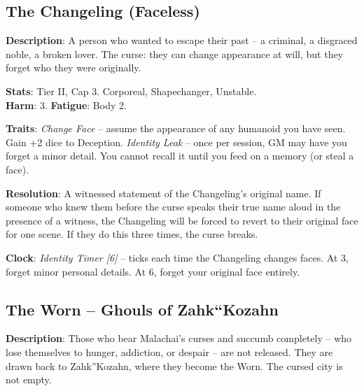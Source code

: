 
\subsection*{The Changeling (Faceless)}

\noindent\textbf{Description}: A person who wanted to escape their past -- a criminal, a disgraced noble, a broken lover. The curse: they can change appearance at will, but they forget who they were originally.

\noindent\textbf{Stats}: Tier II, Cap 3. Corporeal, Shapechanger, Unstable.\\
\textbf{Harm}: 3. \textbf{Fatigue}: Body 2.

\noindent\textbf{Traits}: 
\emph{Change Face} -- assume the appearance of any humanoid you have seen. Gain +2 dice to Deception. \emph{Identity Leak} -- once per session, GM may have you forget a minor detail. You cannot recall it until you feed on a memory (or steal a face).

\noindent\textbf{Resolution}: A witnessed statement of the Changeling's original name. If someone who knew them before the curse speaks their true name aloud in the presence of a witness, the Changeling will be forced to revert to their original face for one scene. If they do this three times, the curse breaks.

\noindent\textbf{Clock}: \emph{Identity Timer [6]} -- ticks each time the Changeling changes faces. At 3, forget minor personal details. At 6, forget your original face entirely.


\subsection*{The Worn -- Ghouls of Zahk``Kozahn}

\noindent\textbf{Description}: Those who bear Malachai's curses and succumb completely -- who lose themselves to hunger, addiction, or despair -- are not released. They are drawn back to Zahk''Kozahn, where they become the Worn. The cursed city is not empty.

